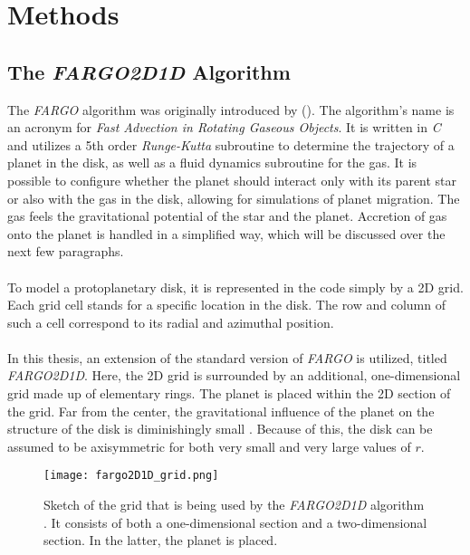\chapter{Methods}

  \section{The \textit{FARGO2D1D} Algorithm}
    \label{sec:fargo_algorithm}
    The \textit{FARGO} algorithm was originally introduced by 
    \citeauthor{Masset_1999} (\citeyear{Masset_1999}).
    The algorithm's name is an acronym for 
    \textit{Fast Advection in Rotating Gaseous Objects}. It is
    written in \textit{C} and utilizes 
    a 5th order \textit{Runge-Kutta} subroutine to determine the trajectory of 
    a planet in the disk, as well as a fluid dynamics subroutine for the gas.
    It is possible to configure whether the planet should interact only with 
    its parent star or also with the gas in the disk, allowing for simulations 
    of planet migration. The gas feels the gravitational potential of the 
    star and the planet. Accretion of gas onto the planet is handled in a 
    simplified way, which will be discussed over the next few paragraphs.
    \\
    \\
    To model a protoplanetary disk, it is represented in the code simply
    by a 2D grid. Each grid cell stands for a specific location in the disk. 
    The row and column of such a cell correspond to its radial and azimuthal 
    position. \\
    \\
    In this thesis, an extension of the standard version of \textit{FARGO} is 
    utilized, titled \textit{FARGO2D1D}. 
    Here, the 2D grid is surrounded by an additional, one-dimensional grid made 
    up of elementary 
    rings. The planet is placed within the 2D section of the grid.
    Far from the center, the gravitational influence of the planet on 
    the structure of the disk is diminishingly small
    \cite{fargo2D1D_what_is_fargo2D1D}. Because of this, the 
    disk can be assumed to be axisymmetric for both very small and very large 
    values of $r$.
    \begin{figure}[h!]
      \centering
      \texttt{[image: fargo2D1D\_grid.png]}
      \caption{
        Sketch of the grid that is being used by the \textit{FARGO2D1D} algorithm 
        \cite{fargo_2D1D_grid}. It consists of both a one-dimensional section
        and a two-dimensional section. In the latter, the planet is placed.
      }
    \end{figure}


